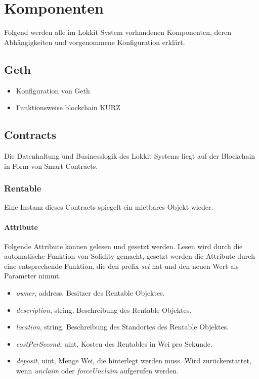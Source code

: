 \section{Komponenten}
\label{sys_sec:Komponenten}
Folgend werden alle im Lokkit System vorhandenen Komponenten, deren Abhängigkeiten und vorgenommene Konfiguration erklärt.

\subsection{Geth}
\label{sys_subsec:Geth}
\begin{itemize}
    \item Konfiguration von Geth
    \item Funktionsweise blockchain KURZ
\end{itemize}

\subsection{Contracts}
Die Datenhaltung und Businesslogik des Lokkit Systems liegt auf der Blockchain in Form von Smart Contracts.
\subsubsection{Rentable}
\label{sys_subsubsec:Rentable}
Eine Instanz dieses Contracts spiegelt ein mietbares Objekt wieder.

\paragraph{Attribute}
Folgende Attribute können gelesen und gesetzt werden. Lesen wird durch die automatische Funktion von Solidity gemacht, gesetzt werden die Attribute durch eine entsprechende Funktion, die den prefix \emph{set} hat und den neuen Wert als Parameter nimmt.

\begin{itemize}
    \item{\emph{owner}, address, Besitzer des Rentable Objektes.}
    \item{\emph{description}, string, Beschreibung des Rentable Objektes.}
    \item{\emph{location}, string, Beschreibung des Standortes des Rentable Objektes.}
    \item{\emph{costPerSecond}, uint, Kosten des Rentables in Wei pro Sekunde.}
    \item{\emph{deposit}, uint, Menge Wei, die hinterlegt werden muss. Wird zurückerstattet, wenn \emph{unclaim} oder \emph{forceUnclaim} aufgerufen werden.}
\end{itemize}

